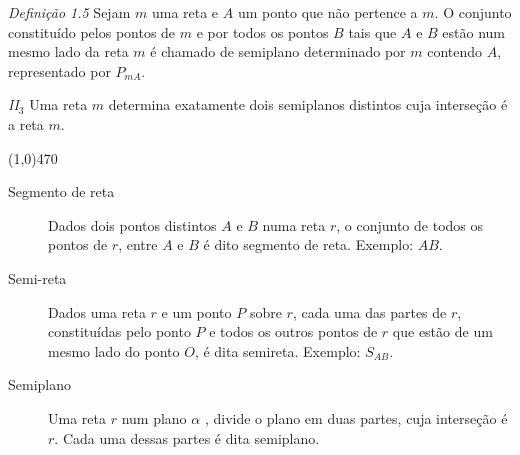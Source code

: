 \documentclass[11pt]{article}
\begin{document}
\emph{Definição 1.5} Sejam $m$ uma reta e $A$ um ponto que não pertence a
$m$. O conjunto constituído pelos pontos de $m$ e por todos os pontos $B$ tais
que $A$ e $B$ estão num mesmo lado da reta $m$ é chamado de semiplano
determinado por $m$ contendo $A$, representado por $P_{mA}$.

\emph{II$_{3}$} Uma reta $m$ determina exatamente dois semiplanos distintos
cuja interseção é a reta $m$.

\line(1,0){470}

\begin{description}
\item[Segmento de reta]
Dados dois pontos distintos $A$ e $B$ numa reta $r$, o conjunto de todos os
pontos de $r$, entre $A$ e $B$ é dito segmento de reta. Exemplo: $AB$.

\item[Semi-reta]
Dados uma reta $r$ e um ponto $P$ sobre $r$, cada uma das partes de $r$,
constituídas pelo ponto $P$ e todos os outros pontos de $r$ que estão de um
mesmo lado do ponto $O$, é dita semireta. Exemplo: $S_{AB}$.

\item[Semiplano]
Uma reta $r$ num plano $\alpha$ , divide o plano em duas partes, cuja
interseção é $r$. Cada uma dessas partes é dita semiplano.
\end{description}
\end{document}

